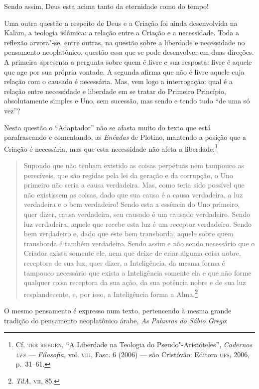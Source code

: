 Sendo assim, Deus esta acima tanto da eternidade como do tempo!

Uma outra questão a respeito de Deus e a Criação foi ainda
desenvolvida na Kalām, a teologia islâmica: a relação
entre a Criação e a necessidade. Toda a reflexão arvora"-se,
entre outras, na questão sobre a liberdade e necessidade no
pensamento neoplatônico, questão essa que se pode desenvolver em
duas direções. A primeira apresenta a pergunta sobre quem é
livre e sua resposta: livre é aquele que age por sua própria
vontade. A segunda afirma que não é livre aquele cuja relação
com o causado é necessária. Mas, vem logo a interrogação: qual é
a relação entre necessidade e liberdade em se tratar do Primeiro
Princípio, absolutamente simples e Uno, sem sucessão, mas sendo
e tendo tudo ``de uma só vez”?

Nesta questão o “Adaptador” não se afasta muito do texto que
está parafraseando e comentando, as \emph{Enéadas} de Plotino,
mantendo a posição que a Criação é necessária, mas que esta
necessidade não afeta a liberdade:\footnote{ Cf. \textsc{ter
reegen,} ``A Liberdade na Teologia do Pseudo"-Aristóteles'',
\emph{Cadernos \textsc{ufs} --- Filosofia,} vol. \textsc{viii}, Fasc. 6 (2006) ---
são Cristóvão: Editora \textsc{ufs}, 2006, p.~31--61.} 

\begin{quote}
Supondo que não tenham existido as coisas perpétuas nem tampouco
as perecíveis, que são regidas pela lei da geração e da
corrupção, o Uno primeiro não seria a causa verdadeira. Mas,
como teria sido possível que não existissem as coisas, dado que
sua causa é a causa verdadeira, a luz verdadeira e o bem
verdadeiro! Sendo esta a essência do Uno primeiro, quer dizer,
causa verdadeira, seu causado é um causado verdadeiro. Sendo luz
verdadeira, aquele que recebe esta luz é um receptor verdadeiro.
Sendo bem verdadeiro e, dado que este bem transborda, aquele
sobre quem transborda é também verdadeiro. Sendo assim e não
sendo necessário que o Criador exista somente ele, nem que
deixe de criar alguma coisa nobre, receptora de sua luz, quer
dizer, a Inteligência, da mesma forma é tampouco necessário que
exista a Inteligência somente ela e que não forme qualquer coisa
receptora da sua ação, da sua potência nobre e de sua luz
resplandecente, e, por isso, a Inteligência forma a
Alma.\footnote{ \emph{TdA}, \textsc{vii}, 85.}
\end{quote}

O mesmo pensamento é expresso num texto, pertencendo à mesma
grande tradição do pensamento neoplatônico árabe, \emph{As Palavras do
Sábio Grego}:

